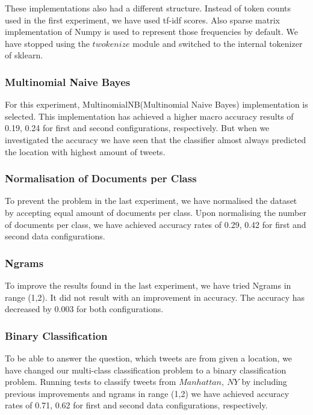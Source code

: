 \documentclass[twoside,11pt]{article}
\begin{document}
These implementations also had a different structure. Instead of token counts used in the first experiment, we have used tf-idf scores. Also sparse matrix implementation of Numpy is used to represent those frequencies by default. We have stopped using the $twokenize$ module and switched to the internal tokenizer of sklearn.

\subsubsection{Multinomial Naive Bayes}

For this experiment, MultinomialNB(Multinomial Naive Bayes) implementation is selected. This implementation has achieved a higher macro accuracy results of 0.19, 0.24 for first and second configurations, respectively. But when we investigated the accuracy we have seen that the classifier almost always predicted the location with highest amount of tweets.

\subsubsection{Normalisation of Documents per Class}
To prevent the problem in the last experiment, we have normalised the dataset by accepting equal amount of documents per class. Upon normalising the number of documents per class, we have achieved accuracy rates of 0.29, 0.42 for first and second data configurations.

\subsubsection{Ngrams}
To improve the results found in the last experiment, we have tried Ngrams in range (1,2). It did not result with an improvement in accuracy. The accuracy has decreased by 0.003 for both configurations.

\subsubsection{Binary Classification}
To be able to answer the question, which tweets are from given a location, we have changed our multi-class classification problem to a binary classification problem. Running tests to classify tweets from $Manhattan,\ NY$ by including previous improvements and ngrams in range (1,2) we have achieved accuracy rates of 0.71, 0.62 for first and second data configurations, respectively. 
\end{document}
